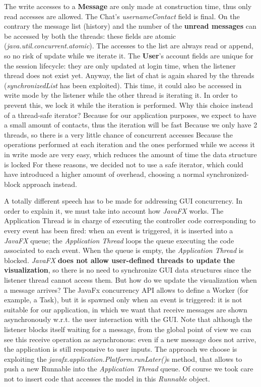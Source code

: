 \begin{outline}
	\1 The write accesses to a \textbf{Message} are only made at construction time, thus only read accesses are allowed.
	\1 The Chat’s \textit{usernameContact} field is final. On the contrary the message list (history) and the number of the \textbf{unread messages} can be accessed by both the threads: these fields are atomic (\textit{java.util.concurrent.atomic}). The accesses to the list are always read or append, so no risk of update while we iterate it.
	\1 The \textbf{User}’s account fields are unique for the session lifecycle: they are only updated at login time, when the listener thread does not exist yet. Anyway, the list of chat is again shared by the threads (\textit{synchronizedList} has been exploited).
This time, it could also be accessed in write mode by the listener while the other thread is iterating it. In order to prevent this, we lock it while the iteration is performed. Why this choice instead of a thread-safe iterator?
	\2 Because for our application purposes, we expect to have a small amount of contacts, thus the iteration will be fast
	\2 Because we only have 2 threads, so there is a very little chance of concurrent accesses
	\2 Because the operations performed at each iteration and the ones performed while we access it in write mode are very easy, which reduces the amount of time the data structure is locked
	\1 For these reasons, we decided not to use a safe iterator, which could have introduced a higher amount of overhead, choosing a normal synchronized-block approach instead.
\end{outline}
A totally different speech has to be made for addressing GUI concurrency. In order to explain it, we must take into account how \textit{JavaFX} works.
The Application Thread is in charge of executing the controller code corresponding to every event has been fired: when an event is triggered, it is inserted into a  \textit{JavaFX} queue; the \textit{Application Thread} loops the queue executing the code associated to each event. When the queue is empty, the  \textit{Application Thread} is blocked.
\textit{JavaFX} \textbf{does not allow user-defined threads to update the visualization}, so there is no need to synchronize GUI data structures since the listener thread cannot access them.
But how do we update the visualization when a message arrives?
The JavaFx concurrency API allows to define a Worker (for example, a Task), but it is spawned only when an event is triggered: it is not suitable for our application, in which we want that receive messages are shown asynchronously w.r.t. the user interaction with the GUI. Note that although the listener blocks itself waiting for a message, from the global point of view we can see this receive operation as asynchronous: even if a new message does not arrive, the application is still responsive to user inputs.
The approach we choose is exploiting the \textit{javafx.application.Platform.runLater()}s method, that allows to push a new Runnable into the \textit{Application Thread} queue. 
Of course we took care not to insert code that accesses the model in this \textit{Runnable} object.

